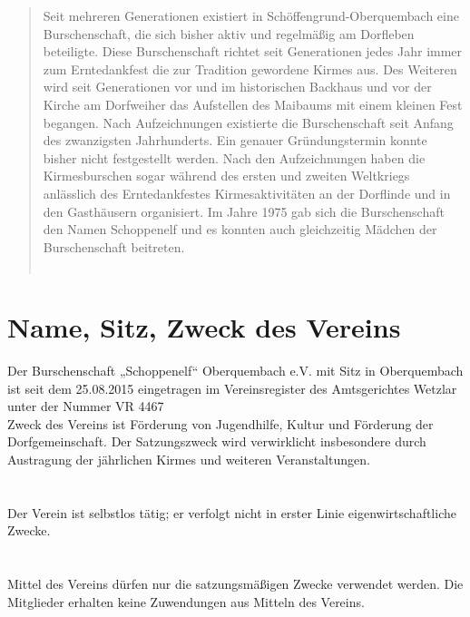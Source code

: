 

\begin{abstract}
	Seit mehreren Generationen existiert in Schöffengrund-Oberquembach eine Burschenschaft, die sich bisher aktiv und regelmäßig am Dorfleben beteiligte. Diese Burschenschaft richtet seit Generationen jedes Jahr immer zum Erntedankfest die zur Tradition gewordene Kirmes aus. Des Weiteren wird seit Generationen vor und im historischen Backhaus und vor der Kirche am Dorfweiher das Aufstellen des Maibaums mit einem kleinen Fest begangen. Nach Aufzeichnungen existierte die Burschenschaft seit Anfang des zwanzigsten Jahrhunderts. Ein genauer Gründungstermin konnte bisher nicht festgestellt werden. Nach den Aufzeichnungen haben die Kirmesburschen sogar während des ersten und zweiten Weltkriegs anlässlich des Erntedankfestes Kirmesaktivitäten an der Dorflinde und in den Gasthäusern organisiert. Im Jahre 1975 gab sich die Burschenschaft den Namen Schoppenelf und es konnten auch gleichzeitig Mädchen der Burschenschaft beitreten.\\
	\\
\end{abstract}

\pagebreak

\section{Name, Sitz, Zweck des Vereins} \label{1}
Der Burschenschaft „Schoppenelf“ Oberquembach e.V.
mit Sitz in Oberquembach ist seit dem 25.08.2015 eingetragen im Vereinsregister des Amtsgerichtes Wetzlar unter der Nummer VR 4467\\
Zweck des Vereins ist Förderung von Jugendhilfe, Kultur und Förderung der Dorfgemeinschaft.
Der Satzungszweck wird verwirklicht insbesondere durch Austragung der jährlichen Kirmes und weiteren Veranstaltungen.

\section{}
Der Verein ist selbstlos tätig; er verfolgt nicht in erster Linie eigenwirtschaftliche Zwecke.

\section{}
Mittel des Vereins dürfen nur die satzungsmäßigen Zwecke verwendet werden. Die Mitglieder erhalten keine Zuwendungen aus Mitteln des Vereins.

